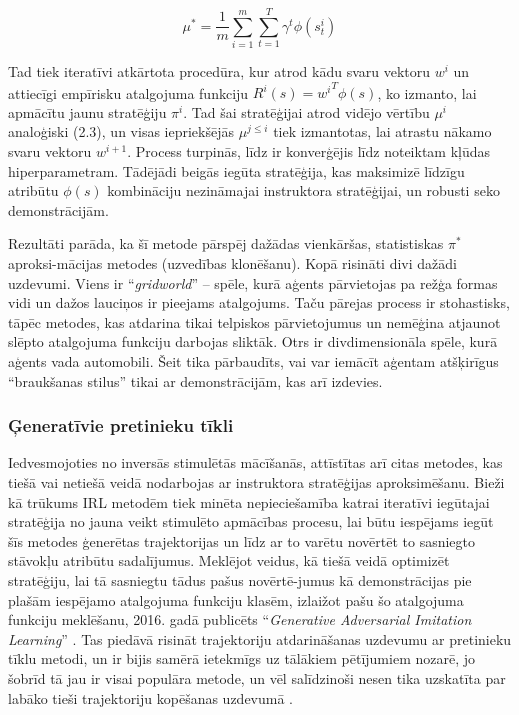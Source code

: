 \documentclass[12pt, a4paper]{article}
\numberwithin{equation}{section} %
\begin{document}
\begin{equation}
    \mu^* = \frac{1}{m}\sum_{i=1}^m\sum_{t=1}^T \gamma^t \phi(s^i_t)
\end{equation}

Tad tiek iteratīvi atkārtota procedūra, kur atrod kādu svaru vektoru $w^{i}$ un attiecīgi empīrisku atalgojuma funkciju $R^{i}(s) = {w^{i}}^T\phi(s)$, ko izmanto, lai apmācītu jaunu stratēģiju $\pi^i$. Tad šai stratēģijai atrod vidējo vērtību $\mu^i$ analoģiski (2.3), un visas iepriekšējās $\mu^{j \leq i}$ tiek izmantotas, lai atrastu nākamo svaru vektoru $w^{i+1}$. Process turpinās, līdz ir konverģējis līdz noteiktam kļūdas hiperparametram. Tādējādi beigās iegūta stratēģija, kas maksimizē līdzīgu atribūtu $\phi(s)$ kombināciju nezināmajai instruktora stratēģijai, un robusti seko demonstrācijām.

Rezultāti parāda, ka šī metode pārspēj dažādas vienkāršas, statistiskas $\pi^*$ aproksi-mācijas metodes (uzvedības klonēšanu). Kopā risināti divi dažādi uzdevumi. Viens ir ``\textit{gridworld}'' -- spēle, kurā aģents pārvietojas pa režģa formas vidi un dažos lauciņos ir pieejams atalgojums. Taču pārejas process ir stohastisks, tāpēc metodes, kas atdarina tikai telpiskos pārvietojumus un nemēģina atjaunot slēpto atalgojuma funkciju darbojas sliktāk. Otrs ir divdimensionāla spēle, kurā aģents vada automobili. Šeit tika pārbaudīts, vai var iemācīt aģentam atšķirīgus ``braukšanas stilus'' tikai ar demonstrācijām, kas arī izdevies.

\subsubsection{Ģeneratīvie pretinieku tīkli}

Iedvesmojoties no inversās stimulētās mācīšanās, attīstītas arī citas metodes, kas tiešā vai netiešā veidā nodarbojas ar instruktora stratēģijas aproksimēšanu. Bieži kā trūkums IRL metodēm tiek minēta nepieciešamība katrai iteratīvi iegūtajai stratēģija no jauna veikt stimulēto apmācības procesu, lai būtu iespējams iegūt šīs metodes ģenerētas trajektorijas un līdz ar to varētu novērtēt to sasniegto stāvokļu atribūtu sadalījumus. Meklējot veidus, kā tiešā veidā optimizēt stratēģiju, lai tā sasniegtu tādus pašus novērtē-jumus kā demonstrācijas pie plašām iespējamo atalgojuma funkciju klasēm, izlaižot pašu šo atalgojuma funkciju meklēšanu, 2016. gadā publicēts ``\textit{Generative Adversarial Imitation Learning}'' \cite{ho2016generative}. Tas piedāvā risināt trajektoriju atdarināšanas uzdevumu ar pretinieku tīklu metodi, un ir bijis samērā ietekmīgs uz tālākiem pētījumiem nozarē, jo šobrīd tā jau ir visai populāra metode, un vēl salīdzinoši nesen tika uzskatīta par labāko tieši trajektoriju kopēšanas uzdevumā \cite{torabi2018generative}.
\end{document}
